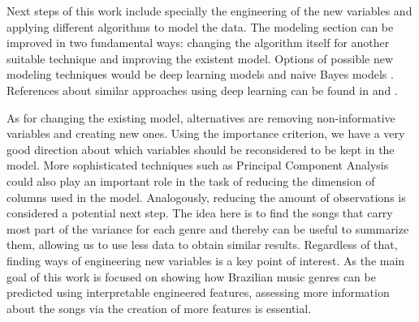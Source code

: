 \documentclass[twocolumn]{article}
\begin{document}
Next steps of this work include specially
the engineering of the new variables and 
applying different algorithms to model the data.
The modeling section can be improved in two
fundamental ways: changing the algorithm itself for
another suitable technique and improving the existent model. Options of possible new modeling techniques would be deep learning models \cite{Lecun2015} and
naive Bayes models \cite{Murphy2006}. 
References about similar approaches 
using deep learning can be found in \cite{cnnmusicgenre} and 
\cite{cnnmusicgenre2}. 

As for changing the existing model, 
alternatives are removing non-informative variables
and creating new ones. Using the importance criterion,
we have a very good direction about
which variables should be reconsidered to be kept
in the model. More sophisticated techniques such as
Principal Component Analysis \cite{Jolliffe2002}
could also play an important role in the task
of reducing the dimension of columns used in 
the model. Analogously, reducing the amount
of observations is considered a potential next step.
The idea here is to find the songs that carry most 
part of the variance for each genre and thereby 
can be useful to summarize them, allowing us to use less 
data to obtain similar results.  Regardless of that,
finding ways of engineering new variables is a key point 
of interest. As the main goal of this work is focused on 
showing how Brazilian music genres can be  predicted 
using interpretable engineered features, assessing more 
information about the songs via the creation of more features 
is essential. 



  
\end{document}

